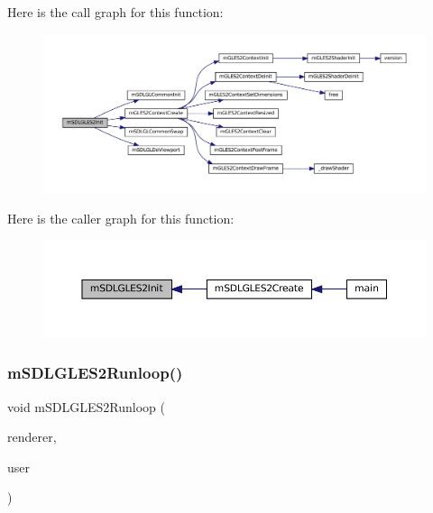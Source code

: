 Here is the call graph for this function\+:
\nopagebreak
\begin{figure}[H]
\begin{center}
\leavevmode
\includegraphics[width=350pt]{gles2-sdl_8c_a454611060aa8f426a7550bec2ef034b5_cgraph}
\end{center}
\end{figure}
Here is the caller graph for this function\+:
\nopagebreak
\begin{figure}[H]
\begin{center}
\leavevmode
\includegraphics[width=350pt]{gles2-sdl_8c_a454611060aa8f426a7550bec2ef034b5_icgraph}
\end{center}
\end{figure}
\mbox{\label{gles2-sdl_8c_a2c8ab44370fc9aa148f328f7f4478b6e}} 
\subsubsection{\texorpdfstring{m\+S\+D\+L\+G\+L\+E\+S2\+Runloop()}{mSDLGLES2Runloop()}}
{\footnotesize\ttfamily void m\+S\+D\+L\+G\+L\+E\+S2\+Runloop (\begin{DoxyParamCaption}\item[{struct \mbox{\hyperlink{structm_s_d_l_renderer}{m\+S\+D\+L\+Renderer}} $\ast$}]{renderer,  }\item[{void $\ast$}]{user }\end{DoxyParamCaption})\hspace{0.3cm}{\ttfamily [static]}}

